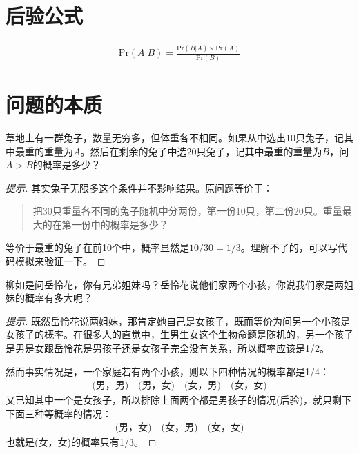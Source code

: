 \section{后验公式}
\label{sec:bayes-theorem}

\begin{theorem}
  \begin{align*}
    \mathrm{Pr}(A|B)=\frac{\mathrm{Pr}(B|A)\times \mathrm{Pr}(A)}{\mathrm{Pr}(B)}
  \end{align*}
\end{theorem}

\section{问题的本质}
\label{sec:equivalent-problem}

\begin{example}
  草地上有一群兔子，数量无穷多，但体重各不相同。如果从中选出10只兔子，记其中最重的重量为$A$。然后在剩余的兔子中选20只兔子，记其中最重的重量为$B$，问$A>B$的概率是多少？
\end{example}
\begin{proof}[提示]
  其实兔子无限多这个条件并不影响结果。原问题等价于：
  \begin{quotation}
    把30只重量各不同的兔子随机中分两份，第一份10只，第二份20只。重量最大的在第一份中的概率是多少？
  \end{quotation}
  等价于最重的兔子在前10个中，概率显然是$10/30=1/3$。理解不了的，可以写代码模拟来验证一下。
\end{proof}

\begin{example}
  柳如是问岳怜花，你有兄弟姐妹吗？岳怜花说他们家两个小孩，你说我们家是两姐妹的概率有多大呢？
\end{example}
\begin{proof}[提示]
  既然岳怜花说两姐妹，那肯定她自己是女孩子，既而等价为问另一个小孩是女孩子的概率。在很多人的直觉中，生男生女这个生物命题是随机的，另一个孩子是男是女跟岳怜花是男孩子还是女孩子完全没有关系，所以概率应该是1/2。

  然而事实情况是，一个家庭若有两个小孩，则以下四种情况的概率都是1/4：
  \begin{align*}
    \text{(男，男)}\quad \text{(男，女)}\quad \text{(女，男)}\quad \text{(女，女)}
  \end{align*}
  又已知其中一个是女孩子，所以排除上面两个都是男孩子的情况(后验)，就只剩下下面三种等概率的情况：
  \begin{align*}
    \text{(男，女)}\quad \text{(女，男)}\quad \text{(女，女)}
  \end{align*}
  也就是(女，女)的概率只有1/3。
\end{proof}